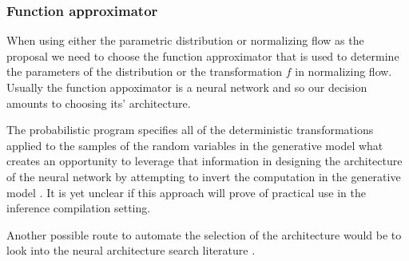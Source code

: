 \documentclass[12pt]{article}
\begin{document}
\subsubsection*{Function approximator}
When using either the parametric distribution or normalizing flow as the proposal we need to choose the function approximator that is used to determine the parameters of the distribution or the transformation $f$ in normalizing flow.
Usually the function appoximator is a neural network and so our decision amounts to choosing its' architecture.

The probabilistic program specifies all of the deterministic transformations applied to the samples of the random variables in the generative model
what creates an opportunity to leverage that information in designing the architecture of the neural network by attempting to invert the computation in the generative model \citep{TavaresEtAl2016,TavaresEtAl2017}.
It is yet unclear if this approach will prove of practical use in the inference compilation setting.

Another possible route to automate the selection of the architecture would be to look into the neural architecture search literature \citep{ElskenEtAl2018,ZophLe2017,pham18a}.








% 
% 
\end{document}
